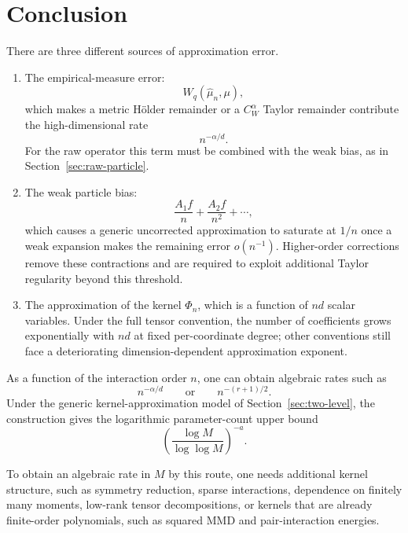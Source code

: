 \documentclass[11pt]{article}
\begin{document}
\section{Conclusion}

There are three different sources of approximation error.

\begin{enumerate}[label=\arabic*.]
\item
The empirical-measure error:
\[
W_q(\widehat\mu_n,\mu),
\]
which makes a metric Hölder remainder or a \(C_W^\alpha\) Taylor
remainder contribute the high-dimensional rate
\[
n^{-\alpha/d}.
\]
For the raw operator this term must be combined with the weak bias, as
in Section~\ref{sec:raw-particle}.

\item
The weak particle bias:
\[
\frac{A_1f}{n}+\frac{A_2f}{n^2}+\cdots,
\]
which causes a generic uncorrected approximation to saturate at
\(1/n\) once a weak expansion makes the remaining error
\(o(n^{-1})\). Higher-order corrections remove these contractions and
are required to exploit additional Taylor regularity beyond this
threshold.

\item
The approximation of the kernel \(\Phi_n\), which is a function of
\(nd\) scalar variables. Under the full tensor convention, the number
of coefficients grows exponentially with \(nd\) at fixed
per-coordinate degree; other conventions still face a deteriorating
dimension-dependent approximation exponent.
\end{enumerate}

As a function of the interaction order \(n\), one can obtain algebraic
rates such as
\[
n^{-\alpha/d}
\qquad\text{or}\qquad
n^{-(r+1)/2}.
\]
Under the generic kernel-approximation model of
Section~\ref{sec:two-level}, the construction gives the logarithmic
parameter-count upper bound
\[
\left(
\frac{\log M}{\log\log M}
\right)^{-a}.
\]

To obtain an algebraic rate in \(M\) by this route, one needs additional
kernel structure, such as symmetry reduction, sparse interactions,
dependence on finitely many moments, low-rank tensor decompositions, or
kernels that are already finite-order polynomials, such as squared MMD
and pair-interaction energies.
\end{document}
